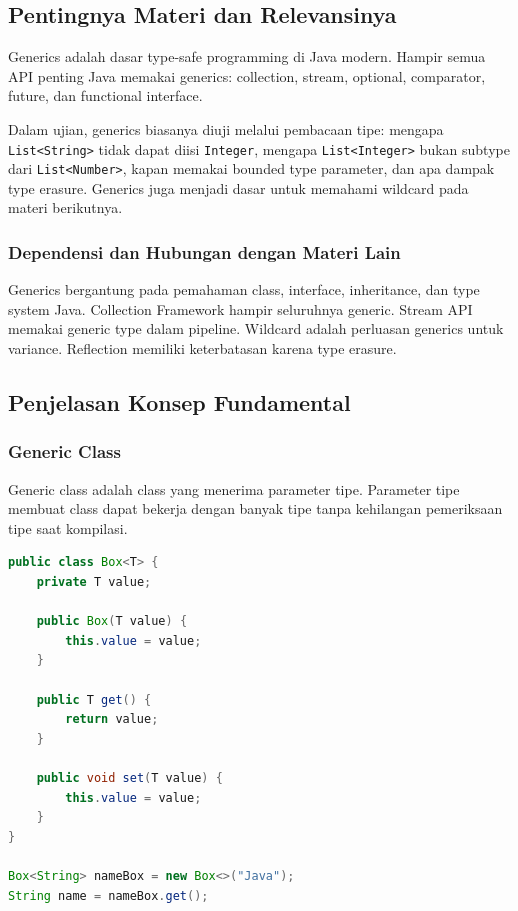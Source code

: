 \subsection{Pentingnya Materi dan Relevansinya}

\begin{jawab}
Generics adalah dasar type-safe programming di Java modern. Hampir semua API penting Java memakai generics: collection, stream, optional, comparator, future, dan functional interface.
\end{jawab}

Dalam ujian, generics biasanya diuji melalui pembacaan tipe: mengapa \texttt{List<String>} tidak dapat diisi \texttt{Integer}, mengapa \texttt{List<Integer>} bukan subtype dari \texttt{List<Number>}, kapan memakai bounded type parameter, dan apa dampak type erasure. Generics juga menjadi dasar untuk memahami wildcard pada materi berikutnya.

\subsubsection{Dependensi dan Hubungan dengan Materi Lain}

Generics bergantung pada pemahaman class, interface, inheritance, dan type system Java. Collection Framework hampir seluruhnya generic. Stream API memakai generic type dalam pipeline. Wildcard adalah perluasan generics untuk variance. Reflection memiliki keterbatasan karena type erasure.

\subsection{Penjelasan Konsep Fundamental}

\subsubsection{Generic Class}

\begin{jawab}
Generic class adalah class yang menerima parameter tipe. Parameter tipe membuat class dapat bekerja dengan banyak tipe tanpa kehilangan pemeriksaan tipe saat kompilasi.
\end{jawab}

\begin{lstlisting}[language=Java, caption={Generic class sederhana}, label={lst:generic-box}]
public class Box<T> {
    private T value;

    public Box(T value) {
        this.value = value;
    }

    public T get() {
        return value;
    }

    public void set(T value) {
        this.value = value;
    }
}

Box<String> nameBox = new Box<>("Java");
String name = nameBox.get();
\end{lstlisting}

